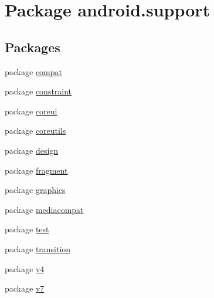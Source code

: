 \hypertarget{namespaceandroid_1_1support}{}\section{Package android.\+support}
\label{namespaceandroid_1_1support}
\subsection*{Packages}
\begin{DoxyCompactItemize}
\item 
package \mbox{\hyperlink{namespaceandroid_1_1support_1_1compat}{compat}}
\item 
package \mbox{\hyperlink{namespaceandroid_1_1support_1_1constraint}{constraint}}
\item 
package \mbox{\hyperlink{namespaceandroid_1_1support_1_1coreui}{coreui}}
\item 
package \mbox{\hyperlink{namespaceandroid_1_1support_1_1coreutils}{coreutils}}
\item 
package \mbox{\hyperlink{namespaceandroid_1_1support_1_1design}{design}}
\item 
package \mbox{\hyperlink{namespaceandroid_1_1support_1_1fragment}{fragment}}
\item 
package \mbox{\hyperlink{namespaceandroid_1_1support_1_1graphics}{graphics}}
\item 
package \mbox{\hyperlink{namespaceandroid_1_1support_1_1mediacompat}{mediacompat}}
\item 
package \mbox{\hyperlink{namespaceandroid_1_1support_1_1test}{test}}
\item 
package \mbox{\hyperlink{namespaceandroid_1_1support_1_1transition}{transition}}
\item 
package \mbox{\hyperlink{namespaceandroid_1_1support_1_1v4}{v4}}
\item 
package \mbox{\hyperlink{namespaceandroid_1_1support_1_1v7}{v7}}
\end{DoxyCompactItemize}
